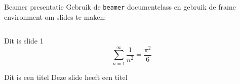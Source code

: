 \begin{frame}[fragile]{Beamer presentatie}
    Gebruik de \texttt{beamer} documentclass en gebruik de frame environment om slides te maken: 

    \inputminted{tex}{test.tex}

\end{frame}

\begin{frame}
    Dit is slide 1
    \[ \sum_{n=1}^\infty \frac{1}{n^2} = \frac{\pi^2}{6} \]
\end{frame}
\begin{frame}{Dit is een titel}
    Deze slide heeft een titel
\end{frame}

